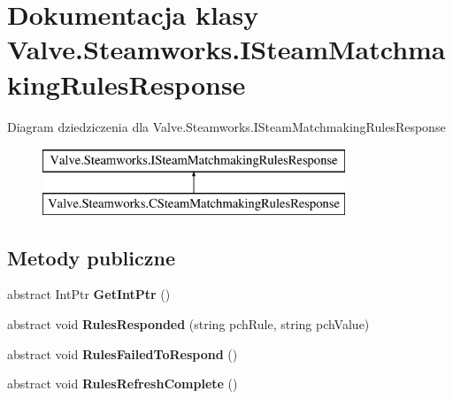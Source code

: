 \hypertarget{class_valve_1_1_steamworks_1_1_i_steam_matchmaking_rules_response}{}\section{Dokumentacja klasy Valve.\+Steamworks.\+I\+Steam\+Matchmaking\+Rules\+Response}
\label{class_valve_1_1_steamworks_1_1_i_steam_matchmaking_rules_response}
Diagram dziedziczenia dla Valve.\+Steamworks.\+I\+Steam\+Matchmaking\+Rules\+Response\begin{figure}[H]
\begin{center}
\leavevmode
\includegraphics[height=2.000000cm]{class_valve_1_1_steamworks_1_1_i_steam_matchmaking_rules_response}
\end{center}
\end{figure}
\subsection*{Metody publiczne}
\begin{DoxyCompactItemize}
\item 
\mbox{\label{class_valve_1_1_steamworks_1_1_i_steam_matchmaking_rules_response_acba4ded25ad958a41815e0a45b6d8272}} 
abstract Int\+Ptr {\bfseries Get\+Int\+Ptr} ()
\item 
\mbox{\label{class_valve_1_1_steamworks_1_1_i_steam_matchmaking_rules_response_a9a30d58df8e15d3b99302e355d2f30aa}} 
abstract void {\bfseries Rules\+Responded} (string pch\+Rule, string pch\+Value)
\item 
\mbox{\label{class_valve_1_1_steamworks_1_1_i_steam_matchmaking_rules_response_a26d8bc957eed9ac2a3f4de9a4e6fbaa4}} 
abstract void {\bfseries Rules\+Failed\+To\+Respond} ()
\item 
\mbox{\label{class_valve_1_1_steamworks_1_1_i_steam_matchmaking_rules_response_a2eeba025de9764bc39b8854e175b0aff}} 
abstract void {\bfseries Rules\+Refresh\+Complete} ()
\end{DoxyCompactItemize}


